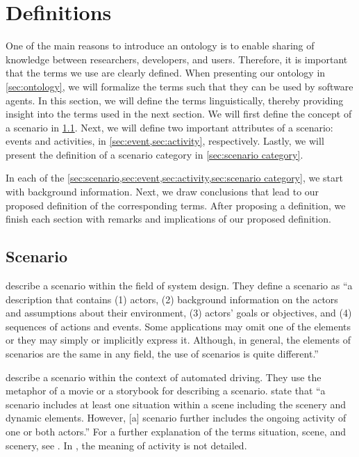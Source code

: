 \section{Definitions}
\label{sec:definitions}

One of the main reasons to introduce an ontology is to enable sharing of knowledge between researchers, developers, and users. 
Therefore, it is important that the terms we use are clearly defined. 
When presenting our ontology in \cref{sec:ontology}, we will formalize the terms such that they can be used by software agents.
In this section, we will define the terms linguistically, thereby providing insight into the terms used in the next section.
We will first define the concept of a scenario in \cref{sec:scenario}. 
Next, we will define two important attributes of a scenario: events and activities, in \cref{sec:event,sec:activity}, respectively. 
Lastly, we will present the definition of a scenario category in \cref{sec:scenario category}.

\cbstartc
In each of the \cref{sec:scenario,sec:event,sec:activity,sec:scenario category}, we start with background information. Next, we draw conclusions that lead to our proposed definition of the corresponding terms. After proposing a definition, we finish each section with remarks and implications of our proposed definition.
\cbend



\subsection{Scenario}
\label{sec:scenario}

\textcite{go2004blind} describe a scenario within the field of system design. They define a scenario as ``a description that contains (1) actors, (2) background information on the actors and assumptions about their environment, (3) actors' goals or objectives, and (4) sequences of actions and events. Some applications may omit one of the elements or they may simply or implicitly express it. Although, in general, the elements of scenarios are the same in any field, the use of scenarios is quite different.'' 

\textcite{geyer2014} describe a scenario within the context of automated driving. They use the metaphor of a movie or a storybook for describing a scenario. \textcite{geyer2014} state that ``a scenario includes at least one situation within a scene including the scenery and dynamic elements. However, [a] scenario further includes the ongoing activity of one or both actors.'' For a further explanation of the terms situation, scene, and scenery, see \cite{geyer2014}. 
In \cite{geyer2014}, the meaning of activity is not detailed.

